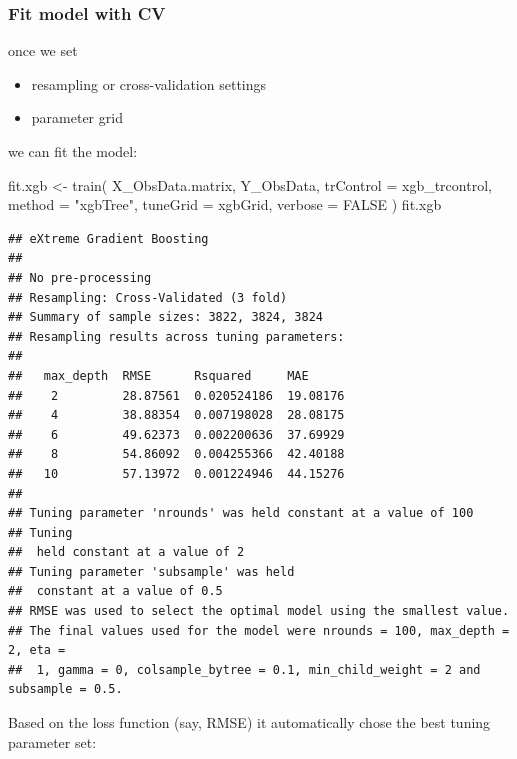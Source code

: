 \documentclass[
]{book}
\newenvironment{Shaded}{\begin{snugshade}}{\end{snugshade}}
\newcommand{\AttributeTok}[1]{\textcolor[rgb]{0.77,0.63,0.00}{#1}}
\newcommand{\ConstantTok}[1]{\textcolor[rgb]{0.00,0.00,0.00}{#1}}
\newcommand{\FunctionTok}[1]{\textcolor[rgb]{0.00,0.00,0.00}{#1}}
\newcommand{\NormalTok}[1]{#1}
\newcommand{\OtherTok}[1]{\textcolor[rgb]{0.56,0.35,0.01}{#1}}
\newcommand{\SpecialCharTok}[1]{\textcolor[rgb]{0.00,0.00,0.00}{#1}}
\newcommand{\StringTok}[1]{\textcolor[rgb]{0.31,0.60,0.02}{#1}}
\providecommand{\tightlist}{%
  \setlength{\itemsep}{0pt}\setlength{\parskip}{0pt}}
\begin{document}
\hypertarget{fit-model-with-cv}{%
\subsubsection{Fit model with CV}\label{fit-model-with-cv}}

once we set

\begin{itemize}
\tightlist
\item
  resampling or cross-validation settings
\item
  parameter grid
\end{itemize}

we can fit the model:

\begin{Shaded}
\begin{Highlighting}[]
\NormalTok{fit.xgb }\OtherTok{\textless{}{-}} \FunctionTok{train}\NormalTok{(}
\NormalTok{  X\_ObsData.matrix, Y\_ObsData,  }
  \AttributeTok{trControl =}\NormalTok{ xgb\_trcontrol,}
  \AttributeTok{method =} \StringTok{"xgbTree"}\NormalTok{,}
  \AttributeTok{tuneGrid =}\NormalTok{ xgbGrid,}
  \AttributeTok{verbose =} \ConstantTok{FALSE}
\NormalTok{)}
\NormalTok{fit.xgb}
\end{Highlighting}
\end{Shaded}

\begin{verbatim}
## eXtreme Gradient Boosting 
## 
## No pre-processing
## Resampling: Cross-Validated (3 fold) 
## Summary of sample sizes: 3822, 3824, 3824 
## Resampling results across tuning parameters:
## 
##   max_depth  RMSE      Rsquared     MAE     
##    2         28.87561  0.020524186  19.08176
##    4         38.88354  0.007198028  28.08175
##    6         49.62373  0.002200636  37.69929
##    8         54.86092  0.004255366  42.40188
##   10         57.13972  0.001224946  44.15276
## 
## Tuning parameter 'nrounds' was held constant at a value of 100
## Tuning
##  held constant at a value of 2
## Tuning parameter 'subsample' was held
##  constant at a value of 0.5
## RMSE was used to select the optimal model using the smallest value.
## The final values used for the model were nrounds = 100, max_depth = 2, eta =
##  1, gamma = 0, colsample_bytree = 0.1, min_child_weight = 2 and subsample = 0.5.
\end{verbatim}

Based on the loss function (say, RMSE) it automatically chose the best tuning parameter set:

\begin{Shaded}
\end{Shaded}
\end{document}
